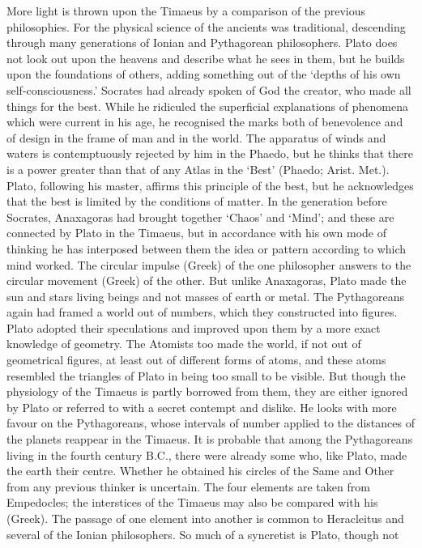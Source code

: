 More light is thrown upon the Timaeus by a comparison of the previous
philosophies. For the physical science of the ancients was traditional,
descending through many generations of Ionian and Pythagorean
philosophers. Plato does not look out upon the heavens and describe what
he sees in them, but he builds upon the foundations of others, adding
something out of the ‘depths of his own self-consciousness.’ Socrates had
already spoken of God the creator, who made all things for the best. While
he ridiculed the superficial explanations of phenomena which were current
in his age, he recognised the marks both of benevolence and of design in
the frame of man and in the world. The apparatus of winds and waters is
contemptuously rejected by him in the Phaedo, but he thinks that there is
a power greater than that of any Atlas in the ‘Best’ (Phaedo; Arist.
Met.). Plato, following his master, affirms this principle of the best,
but he acknowledges that the best is limited by the conditions of matter.
In the generation before Socrates, Anaxagoras had brought together ‘Chaos’
and ‘Mind’; and these are connected by Plato in the Timaeus, but in
accordance with his own mode of thinking he has interposed between them
the idea or pattern according to which mind worked. The circular impulse
(Greek) of the one philosopher answers to the circular movement (Greek) of
the other. But unlike Anaxagoras, Plato made the sun and stars living
beings and not masses of earth or metal. The Pythagoreans again had framed
a world out of numbers, which they constructed into figures. Plato adopted
their speculations and improved upon them by a more exact knowledge of
geometry. The Atomists too made the world, if not out of geometrical
figures, at least out of different forms of atoms, and these atoms
resembled the triangles of Plato in being too small to be visible. But
though the physiology of the Timaeus is partly borrowed from them, they
are either ignored by Plato or referred to with a secret contempt and
dislike. He looks with more favour on the Pythagoreans, whose intervals of
number applied to the distances of the planets reappear in the Timaeus. It
is probable that among the Pythagoreans living in the fourth century B.C.,
there were already some who, like Plato, made the earth their centre.
Whether he obtained his circles of the Same and Other from any previous
thinker is uncertain. The four elements are taken from Empedocles; the
interstices of the Timaeus may also be compared with his (Greek). The
passage of one element into another is common to Heracleitus and several
of the Ionian philosophers. So much of a syncretist is Plato, though not
